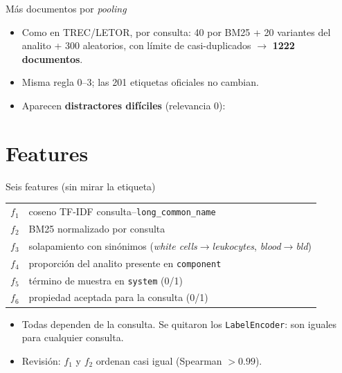 \documentclass{beamer}
\newcommand{\code}[1]{\texttt{#1}}
\begin{document}
\begin{frame}{Más documentos por \emph{pooling}}
    \begin{itemize}\small
        \item Como en TREC/LETOR, por consulta: 40 por BM25 + 20 variantes del analito + 300 aleatorios,
              con límite de casi-duplicados $\rightarrow$ \textbf{1222 documentos}.
        \item Misma regla 0--3; las 201 etiquetas oficiales no cambian.
        \item Aparecen \textbf{distractores difíciles} (relevancia 0):
    \end{itemize}
    \centering
    \resizebox{!}{0.58\textheight}{}

\end{frame}


\section{Features}

\begin{frame}{Seis features (sin mirar la etiqueta)}
    \centering\small
    \begin{tabular}{>{\bfseries}l p{8.6cm}}
        \toprule
        $f_1$ & coseno TF-IDF consulta--\code{long\_common\_name} \\
        $f_2$ & BM25 normalizado por consulta \citep{robertson2009} \\
        $f_3$ & solapamiento con sinónimos (\emph{white cells}$\to$\emph{leukocytes}, \emph{blood}$\to$\emph{bld}) \\
        $f_4$ & proporción del analito presente en \code{component} \\
        $f_5$ & término de muestra en \code{system} (0/1) \\
        $f_6$ & propiedad aceptada para la consulta (0/1) \\
        \bottomrule
    \end{tabular}
    \vspace{6pt}
    \begin{itemize}\small
        \item Todas dependen de la consulta. Se quitaron los \code{LabelEncoder}: son iguales para cualquier consulta.
        \item Revisión: $f_1$ y $f_2$ ordenan casi igual (Spearman $>0.99$).
    \end{itemize}

\end{frame}
\end{document}
